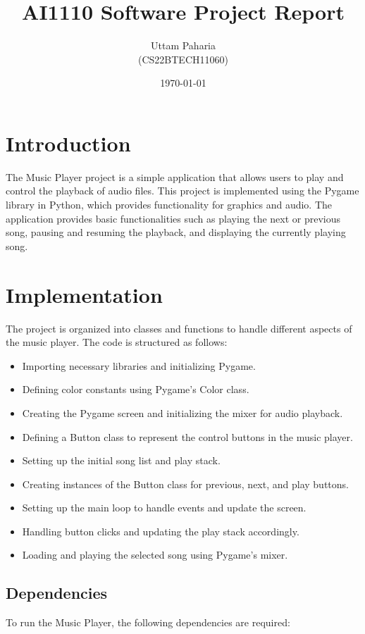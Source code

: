 \documentclass[journal,12pt,twocolumn]{IEEEtran}
\title{AI1110 Software Project Report}
\author{Uttam Paharia\\ (CS22BTECH11060)}
\date{\today}
\begin{document}
\maketitle

\section{Introduction}
The Music Player project is a simple application that allows users to play and control the playback of audio files. This project is implemented using the Pygame library in Python, which provides functionality for graphics and audio. The application provides basic functionalities such as playing the next or previous song, pausing and resuming the playback, and displaying the currently playing song.

\section{Implementation}
The project is organized into classes and functions to handle different aspects of the music player. The code is structured as follows:

\begin{itemize}
\item Importing necessary libraries and initializing Pygame.
\item Defining color constants using Pygame's Color class.
\item Creating the Pygame screen and initializing the mixer for audio playback.
\item Defining a Button class to represent the control buttons in the music player.
\item Setting up the initial song list and play stack.
\item Creating instances of the Button class for previous, next, and play buttons.
\item Setting up the main loop to handle events and update the screen.
\item Handling button clicks and updating the play stack accordingly.
\item Loading and playing the selected song using Pygame's mixer.
\end{itemize}

\subsection{Dependencies}
To run the Music Player, the following dependencies are required:
\end{document}
